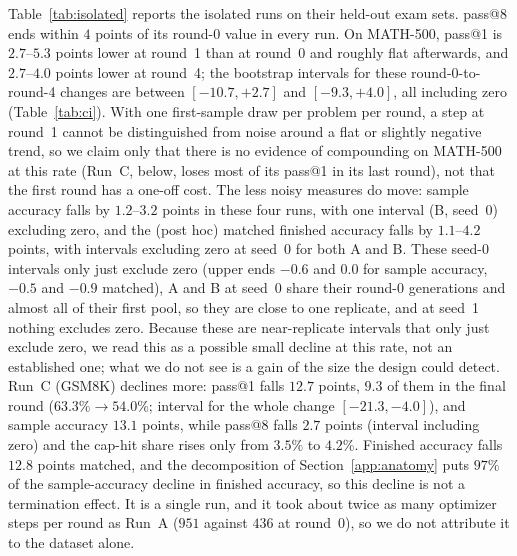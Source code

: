 \documentclass[runningheads]{llncs}
\begin{document}
Table~\ref{tab:isolated} reports the isolated runs on their held-out exam sets.
pass@8 ends within $4$ points of its round-0 value in every run. On MATH-500,
pass@1 is $2.7$--$5.3$ points lower at round~1 than at round~0 and roughly flat
afterwards, and $2.7$--$4.0$ points lower at round~4; the bootstrap intervals for
these round-0-to-round-4 changes are between $[-10.7,+2.7]$ and $[-9.3,+4.0]$,
all including zero (Table~\ref{tab:ci}). With one first-sample draw per problem
per round, a step at round~1 cannot be distinguished from noise around a flat or
slightly negative trend, so we claim only that there is no evidence of
compounding on MATH-500 at this rate (Run~C, below, loses most of its pass@1 in
its last round), not that the first round has a one-off cost. The less
noisy measures do move: sample accuracy falls by $1.2$--$3.2$ points in these
four runs, with one interval (B, seed~0) excluding zero, and the (post hoc)
matched finished accuracy falls by $1.1$--$4.2$ points, with intervals excluding
zero at seed~0 for both A and B. These seed-0 intervals only just exclude zero
(upper ends $-0.6$ and $0.0$ for sample accuracy, $-0.5$ and $-0.9$ matched), A
and B at seed~0 share their round-0 generations and almost all of their first
pool, so they are close to one replicate, and at seed~1 nothing excludes zero.
Because these are near-replicate intervals that only just exclude zero, we
read this as a possible small decline at this rate, not an established one;
what we do not see is a gain of the size the design could detect. Run~C (GSM8K)
declines more: pass@1 falls $12.7$ points, $9.3$ of them in the final round
($63.3\%\to54.0\%$; interval for the whole change $[-21.3,-4.0]$), and sample
accuracy $13.1$ points, while pass@8 falls $2.7$ points (interval including
zero) and the cap-hit share rises only from $3.5\%$ to $4.2\%$. Finished
accuracy falls $12.8$ points matched, and the decomposition of
Section~\ref{app:anatomy} puts $97\%$ of the sample-accuracy decline in finished
accuracy, so this decline is not a termination effect. It is a single run, and
it took about twice as many optimizer steps per round as Run~A ($951$ against
$436$ at round~0), so we do not attribute it to the dataset alone.
\end{document}
